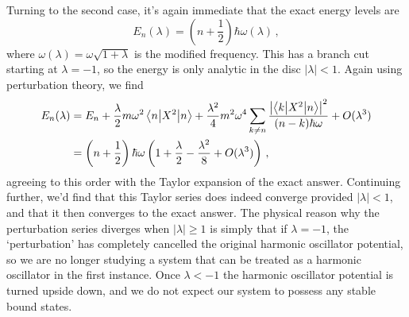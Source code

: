 \documentclass{article}
\theoremstyle{plain}\theoremheaderfont{\normalfont\itshape}\theorembodyfont{\rmfamily}\theoremseparator{.}\newtheorem*{rem}{Remark}\newtheorem*{ex}{Example}\newtheorem*{proof}{Proof}\newtheorem*{altp}{Alternative proof}
\theoremstyle{plain}\theoremheaderfont{\normalfont\bfseries}\theorembodyfont{\rmfamily}\theoremseparator{.}\newtheorem{thm}{Theorem}[section]\newtheorem{lem}[thm]{Lemma}\newtheorem{prop}[thm]{Proposition}\newtheorem*{cor}{Corollary}\newtheorem{defn}[thm]{Definition}\newtheorem{clm}[thm]{Claim}\newtheorem{clminproof}{Claim}
\theoremstyle{break}\theoremheaderfont{\normalfont\itshape}\theorembodyfont{\rmfamily}\theoremseparator{.\medskip}\newtheorem*{proofskip}{Proof}\newtheorem*{exs}{Examples}\newtheorem*{rems}{Remarks}
\theoremstyle{break}\theoremheaderfont{\normalfont\bfseries}\theorembodyfont{\rmfamily}\theoremseparator{.\medskip}\newtheorem{lemskip}[thm]{Lemma}\newtheorem{defnskip}[thm]{Definition}\newtheorem{propskip}[thm]{Proposition}\newtheorem{thmskip}[thm]{Theorem}
\numberwithin{equation}{section}
\newcommand{\mel}[3]{\left\langle #1 \middle| #2 \middle| #3 \right\rangle}
\newcommand{\expval}[2]{\left\langle #2 \middle| #1 \middle| #2 \right\rangle}
\newcommand{\abs}[1]{\left| #1 \right|}
\begin{document}
    Turning to the second case, it's again immediate that the exact energy levels are
    \begin{equation}
        E_n(\lambda)=\left(n+\frac{1}{2}\right)\hbar\omega(\lambda)\,,
    \end{equation}
    where \(\omega(\lambda)=\omega\sqrt{1+\lambda}\) is the modified frequency. This has a branch cut starting at \(\lambda=-1\), so the energy is only analytic in the disc \(\abs{\lambda}<1\). Again using perturbation theory, we find
    \begin{align}
        E_n(\lambda)&=E_n+\frac{\lambda}{2}m\omega^2\expval{X^2}{n}+\frac{\lambda^2}{4}m^2\omega^4\sum_{k\ne n}\frac{\abs{\mel{k}{X^2}{n}}^2}{(n-k)\hbar\omega}+O(\lambda^3)\notag\\
        &=\left(n+\frac{1}{2}\right)\hbar\omega\left(1+\frac{\lambda}{2}-\frac{\lambda^2}{8}+O(\lambda^3)\right)\,,
    \end{align}
    agreeing to this order with the Taylor expansion of the exact answer. Continuing further, we'd find that this Taylor series does indeed converge provided \(\abs{\lambda}<1\), and that it then converges to the exact answer. The physical reason why the perturbation series diverges when \(\abs{\lambda}\ge 1\) is simply that if \(\lambda=-1\), the `perturbation' has completely cancelled the original harmonic oscillator potential, so we are no longer studying a system that can be treated as a harmonic oscillator in the first instance. Once \(\lambda<-1\) the harmonic oscillator potential is turned upside down, and we do not expect our system to possess any stable bound states.
\end{document}
